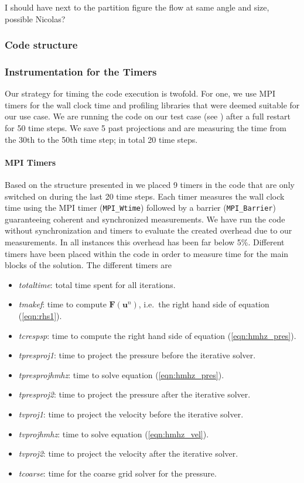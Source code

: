 \documentclass{sig-alternate}
\begin{document}
I should have next to the partition figure the flow at same angle and size, possible Nicolas? 
\subsubsection{Code structure}
\label{sec:code}

\subsubsection{Instrumentation for the Timers}
\label{sec:timers}
Our strategy for timing the code execution is twofold. For one, we use MPI
timers for the wall clock time and profiling libraries that were deemed suitable
for our use case. We are running the code on our test case (see
) after a full restart for 50 time steps. We save 5 past
projections and are measuring the time from the 30th to the 50th time step; in
total 20 time steps. 
\paragraph{MPI Timers}
Based on the
structure presented in  we placed 9 timers in the code that are
only switched on during the last 20 time steps. Each timer measures the wall
clock time using the MPI timer ({\tt MPI\_Wtime}) followed by a barrier
({\tt MPI\_Barrier}) guaranteeing coherent and synchronized measurements. We
have run the code without synchronization and timers to evaluate the created
overhead due to our measurements. In all instances this overhead has been far
below 5\%. 
Different timers have been placed within the code in order to measure time for the main blocks of the solution. The different timers are
\begin{itemize}
 \item \textit{totaltime}: total time spent for all iterations.
 \item \textit{tmakef}: time to compute $\mathbf{F} \left( \mathbf{u}^{n} \right)$, i.e.\ the right hand side of equation (\ref{eqn:rhs1}).
 \item \textit{tcrespsp}: time to compute the right hand side of equation (\ref{eqn:hmhz_pres}).
 \item \textit{tpresproj1}: time to project the pressure before the iterative solver.
 \item \textit{tpresprojhmhz}: time to solve equation (\ref{eqn:hmhz_pres}).
 \item \textit{tpresproj2}: time to project the pressure after the iterative solver.
 \item \textit{tvproj1}: time to project the velocity before the iterative solver.
 \item \textit{tvprojhmhz}: time to solve equation (\ref{eqn:hmhz_vel}).
 \item \textit{tvproj2}: time to project the velocity after the iterative solver.
 \item \textit{tcoarse}: time for the coarse grid solver for the pressure.
\end{itemize}
\end{document}
